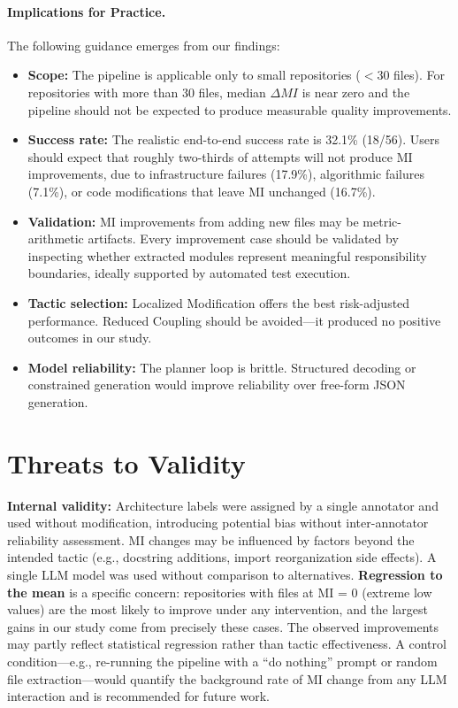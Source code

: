 \documentclass[sigconf,review,anonymous]{acmart}
\begin{document}
\paragraph{Implications for Practice.}
The following guidance emerges from our findings:
\begin{itemize}[nosep]
    \item \textbf{Scope:} The pipeline is applicable only to small repositories ($<$30 files). For repositories with more than 30 files, median $\Delta MI$ is near zero and the pipeline should not be expected to produce measurable quality improvements.
    \item \textbf{Success rate:} The realistic end-to-end success rate is 32.1\% (18/56). Users should expect that roughly two-thirds of attempts will not produce MI improvements, due to infrastructure failures (17.9\%), algorithmic failures (7.1\%), or code modifications that leave MI unchanged (16.7\%).
    \item \textbf{Validation:} MI improvements from adding new files may be metric-arithmetic artifacts. Every improvement case should be validated by inspecting whether extracted modules represent meaningful responsibility boundaries, ideally supported by automated test execution.
    \item \textbf{Tactic selection:} Localized Modification offers the best risk-adjusted performance. Reduced Coupling should be avoided---it produced no positive outcomes in our study.
    \item \textbf{Model reliability:} The planner loop is brittle. Structured decoding or constrained generation would improve reliability over free-form JSON generation.
\end{itemize}

\section{Threats to Validity}

\textbf{Internal validity:} Architecture labels were assigned by a single annotator and used without modification, introducing potential bias without inter-annotator reliability assessment. MI changes may be influenced by factors beyond the intended tactic (e.g., docstring additions, import reorganization side effects). A single LLM model was used without comparison to alternatives. \textbf{Regression to the mean} is a specific concern: repositories with files at MI = 0 (extreme low values) are the most likely to improve under any intervention, and the largest gains in our study come from precisely these cases. The observed improvements may partly reflect statistical regression rather than tactic effectiveness. A control condition---e.g., re-running the pipeline with a ``do nothing'' prompt or random file extraction---would quantify the background rate of MI change from any LLM interaction and is recommended for future work.
\end{document}
